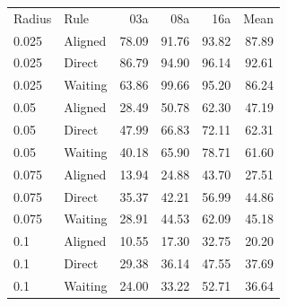 \begin{tabular}{llrrrr}
Radius & Rule & 03a & 08a & 16a & Mean \\
0.025 & Aligned & 78.09 & 91.76 & 93.82 & 87.89\\
0.025 & Direct & 86.79 & 94.90 & 96.14 & 92.61\\
0.025 & Waiting & 63.86 & 99.66 & 95.20 & 86.24\\
0.05 & Aligned & 28.49 & 50.78 & 62.30 & 47.19\\
0.05 & Direct & 47.99 & 66.83 & 72.11 & 62.31\\
0.05 & Waiting & 40.18 & 65.90 & 78.71 & 61.60\\
0.075 & Aligned & 13.94 & 24.88 & 43.70 & 27.51\\
0.075 & Direct & 35.37 & 42.21 & 56.99 & 44.86\\
0.075 & Waiting & 28.91 & 44.53 & 62.09 & 45.18\\
0.1 & Aligned & 10.55 & 17.30 & 32.75 & 20.20\\
0.1 & Direct & 29.38 & 36.14 & 47.55 & 37.69\\
0.1 & Waiting & 24.00 & 33.22 & 52.71 & 36.64\\
\end{tabular}